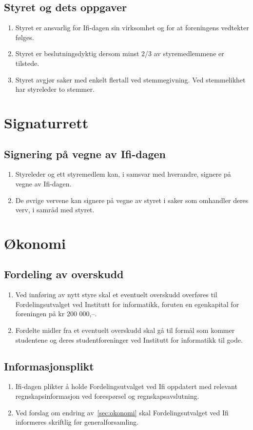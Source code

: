 \documentclass[norsk,a4paper]{article}
\begin{document}
\subsection{Styret og dets oppgaver}
\begin{enumerate}
    \item{Styret er ansvarlig for Ifi-dagen sin virksomhet og for at foreningens vedtekter følges.}
    \item{Styret er beslutningsdyktig dersom minst 2/3 av styremedlemmene er tilstede.}
    \item{Styret avgjør saker med enkelt flertall ved stemmegivning. Ved stemmelikhet har styreleder to stemmer.}
\end{enumerate}

\section{Signaturrett}
\subsection{Signering på vegne av Ifi-dagen}
\begin{enumerate}
    \item{Styreleder og ett styremedlem kan, i samsvar med hverandre, signere på vegne av Ifi-dagen.}
    \item{De øvrige vervene kan signere på vegne av styret i saker som omhandler deres verv, i samråd med styret.}
\end{enumerate}

\section{Økonomi\label{sec:okonomi}}
\subsection{Fordeling av overskudd}
\begin{enumerate}
    \item{Ved innføring av nytt styre skal et eventuelt overskudd overføres til Fordelingsutvalget ved Institutt for informatikk, foruten en egenkapital for foreningen på kr 200 000,--.}
    \item{Fordelte midler fra et eventuelt overskudd skal gå til formål som kommer studentene og deres studentforeninger ved Institutt for informatikk til gode.}
\end{enumerate}

\subsection{Informasjonsplikt}
\begin{enumerate}
    \item{Ifi-dagen plikter å holde Fordelingsutvalget ved Ifi oppdatert med relevant regnskapsinformasjon ved forespørsel og regnskapsavslutning.}
    \item{Ved forslag om endring av~\ref{sec:okonomi} skal Fordelingsutvalget ved Ifi informeres skriftlig før generalforsamling.}
\end{enumerate}
\end{document}
